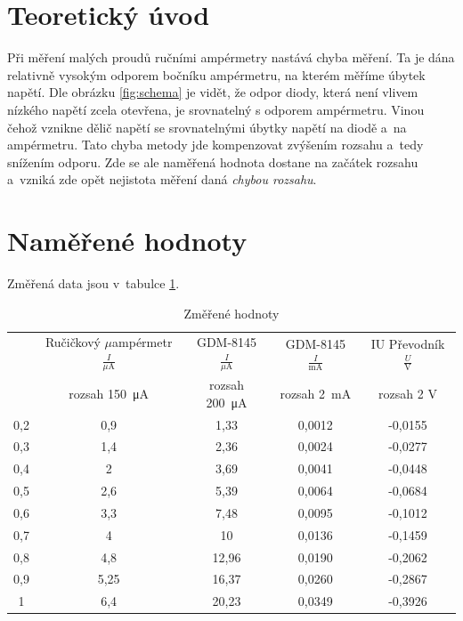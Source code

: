 \documentclass[a4paper,12pt]{article}   %
\newcommand{\tmu}{$\mu$}
\begin{document}
\section{Teoretický úvod}

Při měření malých proudů ručními ampérmetry nastává chyba měření. Ta je dána relativně vysokým odporem bočníku ampérmetru, na kterém měříme úbytek napětí. Dle obrázku \ref{fig:schema} je vidět, že odpor diody, která není vlivem nízkého napětí zcela otevřena, je srovnatelný s odporem ampérmetru. Vinou čehož vznikne dělič napětí se srovnatelnými úbytky napětí na diodě a~na ampérmetru. Tato chyba metody jde kompenzovat zvýšením rozsahu a~tedy snížením odporu. Zde se ale naměřená hodnota dostane na začátek rozsahu a~vzniká zde opět nejistota měření daná \textit{chybou rozsahu}. 



\section{Naměřené hodnoty}

Změřená data jsou v~tabulce \ref{tab:zmereno}.
\begin{table}[h!]
    \centering
    \begin{tabular}{|c|c|c|c|c|}
        \hline
        \rule{0pt}{2.5ex}
        \multirow{2}{*}{Vstupní napětí $\frac{U}{\textrm{V}}$}& Ručičkový \tmu ampérmetr$\frac{I}{\mu\textrm{A}}$ 	&GDM-8145 $\frac{I}{\mu\textrm{A}}$	&GDM-8145 $\frac{I}{\textrm{mA}}$	&IU Převodník $\frac{U}{\textrm{V}}$  \\[.7ex]
        & rozsah  150~μA & rozsah 200~μA & rozsah  2~mA & rozsah  2 V\\\hline\hline
        0,2 &0,9    &1,33   &0,0012 &-0,0155     \\\hline
        0,3 &1,4    &2,36   &0,0024 &-0,0277     \\\hline
        0,4 &2      &3,69   &0,0041 &-0,0448       \\\hline
        0,5 &2,6    &5,39   &0,0064 &-0,0684     \\\hline
        0,6 &3,3    &7,48   &0,0095 &-0,1012     \\\hline
        0,7 &4      &10     &0,0136 &-0,1459         \\\hline
        0,8 &4,8    &12,96  &0,0190 &-0,2062    \\\hline
        0,9 &5,25   &16,37  &0,0260 &-0,2867   \\\hline
        1   &6,4    &20,23  &0,0349 &-0,3926      \\\hline
    
    \end{tabular}
    \caption{Změřené hodnoty}
    \label{tab:zmereno}
\end{table}
\end{document}
